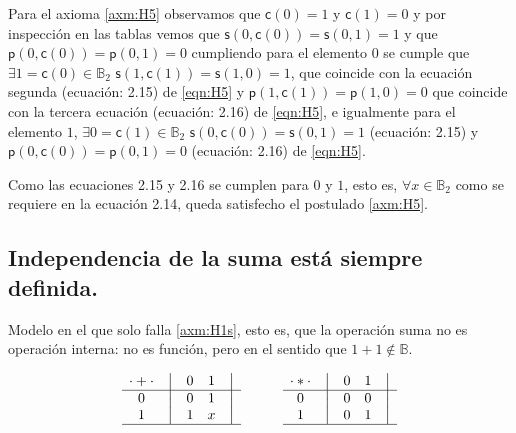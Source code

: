 \documentclass[final,12pt,a4paper,twoside,fleqn]{extbook}
\newcommand{\bfs}[1]{\ensuremath{\boldsymbol{#1}}}
\newcommand{\funcsum}{\ensuremath{\bfs{\mathsf{s}}}}
\newcommand{\funcsumat}[2]{\ensuremath{\funcsum\left({#1,#2}\right)}}
\newcommand{\funcprod}{\ensuremath{\bfs{\mathsf{p}}}}
\newcommand{\funcprodat}[2]{\ensuremath{\funcprod\left({#1,#2}\right)}}
\newcommand{\funccompl}{\ensuremath{\bfs{\mathsf{c}}}}
\newcommand{\funccomplat}[1]{\ensuremath{\funccompl\left({#1}\right)}}
\newcommand{\setB}{\ensuremath{\mathbb{B}}}
\theoremstyle{definition}
\theoremstyle{remark}
\begin{document}
	Para el axioma \ref{axm:H5} observamos que \(\funccomplat{0} = 1\) y
\(\funccomplat{1} = 0\) y por inspección en las tablas vemos que
\(\funcsumat{0}{\funccomplat{0}} = \funcsumat{0}{1} = 1\) y que
\(\funcprodat{0}{\funccomplat{0}} = \funcprodat{0}{1} = 0\) cumpliendo para
el elemento \(0\) se cumple que \(\exists 1 = \funccomplat{0} \in \setB_2 \)
\(\funcsumat{1}{\funccomplat{1}} = \funcsumat{1}{0} = 1\), que coincide con
la ecuación segunda (ecuación: 2.15) de \ref{eqn:H5} y
\(\funcprodat{1}{\funccomplat{1}}=\funcprodat{1}{0} = 0\) que coincide con la
tercera ecuación (ecuación: 2.16) de \ref{eqn:H5}, e igualmente para el
elemento \( 1 \), \(\exists 0 = \funccomplat{1} \in \setB_2 \) \(
\funcsumat{0}{\funccomplat{0}} = \funcsumat{0}{1} = 1\) (ecuación: 2.15) y
\(\funcprodat{0}{\funccomplat{0}} =\funcprodat{0}{1} = 0\) (ecuación: 2.16)
de \ref{eqn:H5}.




	Como las ecuaciones 2.15 y 2.16 se cumplen para \(0\) y \(1\), esto es,
\(\forall x \in \setB_2\) como se requiere en la ecuación 2.14, queda
satisfecho el postulado \ref{axm:H5}.



\subsection{Independencia de la suma está siempre definida.}



Modelo en el que solo falla \ref{axm:H1s}, esto es, que la operación suma
no es operación interna: no es función, pero en el sentido que \(1 + 1 \notin
\setB\).


\[
    \begin{matrix}
        {\cdot + \cdot} & \big{\vert} & {0} & {1} & \big{\vert} \\
        \hline
        {0}             & \big{\vert} & {0} & {1} & \big{\vert} \\
        {1}             & \big{\vert} & {1} & {x} & \big{\vert} \\
        \hline
    \end{matrix}
    \qquad\qquad
    \begin{matrix}
        {\cdot * \cdot} & \big{\vert} & {0} & {1} & \big{\vert} \\
        \hline
        {0}                   & \big{\vert} & {0} & {0} & \big{\vert} \\
        {1}                   & \big{\vert} & {0} & {1} & \big{\vert} \\
        \hline
    \end{matrix}
\]
\end{document}
